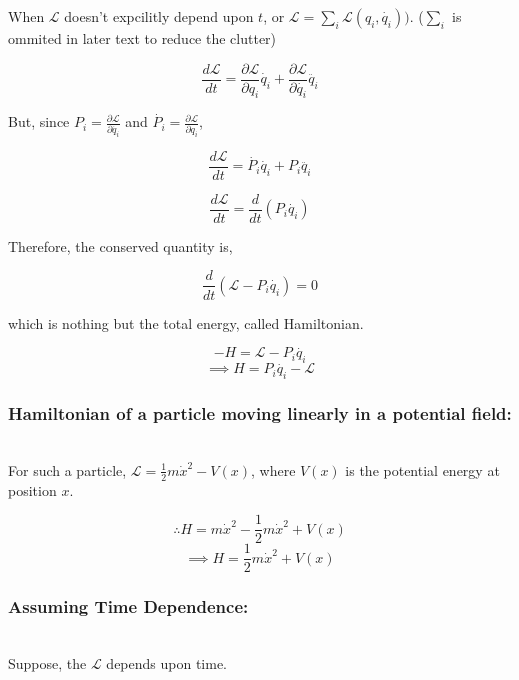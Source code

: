 \documentclass[a4paper]{article}
\newcommand{\Lagr}{\mathcal{L}}
\newcommand{\ddt}{\frac{d}{dt}}
\newcommand{\ddtf}[1]{\frac{d #1}{dt}}
\newcommand{\pdt}[2]{\frac{\partial #1}{\partial #2}}
\newcommand{\half}{\frac{1}{2}}
\begin{document}


			When $\Lagr$ doesn't expcilitly depend upon $t$, or $\Lagr = \sum_i \Lagr(q_i, \dot{q_i}))$. ($\sum_i$ is ommited in later text to reduce the clutter)

			$$ \ddtf{\Lagr} = \pdt{\Lagr}{q_i}\dot{q_i} + \pdt{\Lagr}{\dot{q_i}} \ddot{q_i} $$

			But, since $ P_i = \pdt{\Lagr}{\dot{q_i}} $ and $ \dot{P_i} = \pdt{\Lagr}{q_i} $,

			$$ \ddtf{\Lagr} = \dot{P_i} \dot{q_i} + P_i \ddot{q_i} $$

			$$ \ddtf{\Lagr} = \ddt(P_i \dot{q_i}) $$

			Therefore, the conserved quantity is,

			\begin{equation}
				\ddt(\Lagr - P_i \dot{q_i}) = 0
			\end{equation}

			which is nothing but the total energy, called Hamiltonian.

			$$ -H = \Lagr - P_i \dot{q_i} $$
			\begin{equation}
				\implies H = P_i \dot{q_i} - \Lagr
			\end{equation}


			\subsubsection*{Hamiltonian of a particle moving linearly in a potential field: }
				\noindent \\

				For such a particle, $\Lagr = \half m \dot{x}^2 - V(x)$, where $V(x)$ is the potential energy at position $x$.

				$$ \therefore H = m\dot{x}^2 - \half m \dot{x}^2 + V(x) $$
				$$ \implies H = \half m \dot{x}^2 + V(x) $$

			\subsubsection*{Assuming Time Dependence: }
				\noindent \\

				Suppose, the $\Lagr$ depends upon time.
\end{document}
